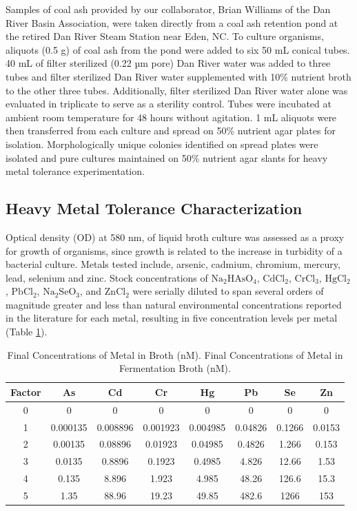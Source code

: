 \documentclass[ms, hidelinks]{uncgdissertationexp3}
\theoremstyle{plain}
\theoremstyle{definition}
\theoremstyle{remark}
\newcommand{\titlecaption}[2]{\caption[#1]{#1. #2}}
\begin{document}
Samples of coal ash provided by our collaborator, Brian Williams of the Dan River Basin Association, were taken directly from a coal ash retention pond at the retired Dan River Steam Station near Eden, NC. To culture organisms, aliquots (0.5 g) of coal ash from the pond were added to six 50 mL conical tubes. 40 mL of filter sterilized (0.22 µm pore) Dan River water was added to three tubes and filter sterilized Dan River water supplemented with 10\% nutrient broth to the other three tubes. Additionally, filter sterilized Dan River water alone was evaluated in triplicate to serve as a sterility control. Tubes were incubated at ambient room temperature for 48 hours without agitation. 1 mL aliquots were then transferred from each culture and spread on 50\% nutrient agar plates for isolation. Morphologically unique colonies identified on spread plates were isolated and pure cultures maintained on 50\% nutrient agar slants for heavy metal tolerance experimentation. 

\subsection{Heavy Metal Tolerance Characterization}\label{heavy-metal-tolerance-characterization}

Optical density (OD) at 580 nm, of liquid broth culture was assessed as a proxy for growth of organisms, since growth is related to the increase in turbidity of a bacterial culture. Metals tested include, arsenic, cadmium, chromium, mercury, lead, selenium and zinc. Stock concentrations of \(\mathrm{Na_2HAsO_4}\), \(\mathrm{CdCl_2}\), \(\mathrm{CrCl_3}\), \(\mathrm{HgCl_2}\), \(\mathrm{PbCl_2}\), \(\mathrm{Na_2SeO_3}\), and \(\mathrm{ZnCl_2}\) were serially diluted to span several orders of magnitude greater and less than natural environmental concentrations reported in the literature for each metal, resulting in five concentration levels per metal (Table \ref{tab:metals}).

\begin{table}[htbp]
\titlecaption{Final Concentrations of Metal in Broth (nM)}{Final Concentrations of Metal in Fermentation Broth (nM).}\label{tab:metals}
\centering
\begin{tabular}{cccccccc}
\toprule
Factor & As & Cd & Cr & Hg & Pb & Se & Zn\\
\midrule
0 & 0 & 0 & 0 & 0 & 0 & 0 & 0\\ 
1 & 0.000135 & 0.008896 & 0.001923 & 0.004985 & 0.04826 & 0.1266 & 0.0153\\
2 & 0.00135 & 0.08896 & 0.01923 & 0.04985 & 0.4826 & 1.266 & 0.153\\
3 & 0.0135 & 0.8896 & 0.1923 & 0.4985 & 4.826 & 12.66 & 1.53\\
4 & 0.135 & 8.896 & 1.923 & 4.985 & 48.26 & 126.6 & 15.3\\
5 & 1.35 & 88.96 & 19.23 & 49.85 & 482.6 & 1266 & 153\\
\bottomrule
\end{tabular}
\end{table}
\end{document}
